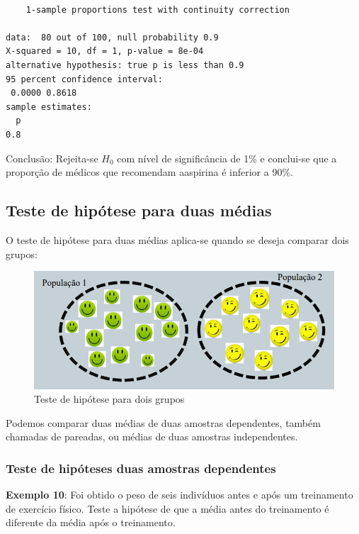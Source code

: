 \documentclass[12pt,brazil,oneside]{book}
\begin{document}
\begin{verbatim}

    1-sample proportions test with continuity correction

data:  80 out of 100, null probability 0.9
X-squared = 10, df = 1, p-value = 8e-04
alternative hypothesis: true p is less than 0.9
95 percent confidence interval:
 0.0000 0.8618
sample estimates:
  p 
0.8 
\end{verbatim}

Conclusão: Rejeita-se \(H_0\) com nível de significância de 1\% e conclui-se que a proporção de médicos que recomendam aaspirina é inferior a 90\%.

\hypertarget{teste-de-hipotese-para-duas-medias}{%
\subsection{Teste de hipótese para duas médias}\label{teste-de-hipotese-para-duas-medias}}

O teste de hipótese para duas médias aplica-se quando se deseja comparar dois grupos:

\begin{figure}[H]

{\centering \includegraphics[width=0.7\linewidth]{testehip2} 

}

\caption{Teste de hipótese para dois grupos}\label{fig:testehip2}
\end{figure}

Podemos comparar duas médias de duas amostras dependentes, também chamadas de pareadas, ou médias de duas amostras independentes.

\hypertarget{teste-de-hipoteses-duas-amostras-dependentes}{%
\subsubsection{Teste de hipóteses duas amostras dependentes}\label{teste-de-hipoteses-duas-amostras-dependentes}}

\textbf{Exemplo 10}: Foi obtido o peso de seis indivíduos antes e após um treinamento de exercício físico. Teste a hipótese de que a média antes do treinamento é diferente da média após o treinamento.
\end{document}
